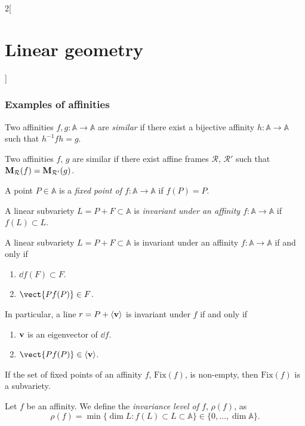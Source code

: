 \documentclass[../../../main.tex]{subfiles}
\begin{document}
\begin{multicols}{2}[\section{Linear geometry}]
    \subsubsection*{Examples of affinities}
    \begin{definition}
        Two affinities $f,g:\mathbb{A}\rightarrow\mathbb{A}$ are \textit{similar} if there exist a bijective affinity $h:\mathbb{A}\rightarrow\mathbb{A}$ such that $h^{-1}fh=g$.
    \end{definition}
    \begin{prop}
        Two affinities $f$, $g$ are similar if there exist affine frames $\mathcal{R}$, $\mathcal{R}'$ such that $\boldsymbol{\mathrm{M}}_\mathcal{R}(f)=\boldsymbol{\mathrm{M}}_{\mathcal{R}'}(g)$.
    \end{prop}
    \begin{definition}
        A point $P\in\mathbb{A}$ is a \textit{fixed point of $f:\mathbb{A}\rightarrow\mathbb{A}$} if $f(P)=P$.
    \end{definition}
    \begin{definition}
        A linear subvariety $L=P+F\subset\mathbb{A}$ is \textit{invariant under an affinity $f:\mathbb{A}\rightarrow\mathbb{A}$} if $f(L)\subset L$.
    \end{definition}
    \begin{prop}
        A linear subvariety $L=P+F\subset\mathbb{A}$ is invariant under an affinity $f:\mathbb{A}\rightarrow\mathbb{A}$ if and only if
        \begin{enumerate}
            \item $\dd f(F)\subset F$.
            \item $\vect{Pf(P)}\in F$.
        \end{enumerate} In particular, a line $r=P+\langle\boldsymbol{\mathrm{v}}\rangle$ is invariant under $f$ if and only if
        \begin{enumerate}
            \item $\boldsymbol{\mathrm{v}}$ is an eigenvector of $\dd f$.
            \item $\vect{Pf(P)}\in\langle\vectorfunction{v}\rangle$.
        \end{enumerate}
    \end{prop}
    \begin{prop}
        If the set of fixed points of an affinity $f$, $\text{Fix}(f)$, is non-empty, then $\text{Fix}(f)$ is a subvariety.
    \end{prop}
    \begin{definition}
        Let $f$ be an affinity. We define the \textit{invariance level of $f$}, $\rho(f)$, as $$\rho(f)=\min\{\dim L:f(L)\subset L\subset\mathbb{A}\}\in\{0,\ldots,\dim\mathbb{A}\}.$$

\end{definition}
\end{multicols}
\end{document}

